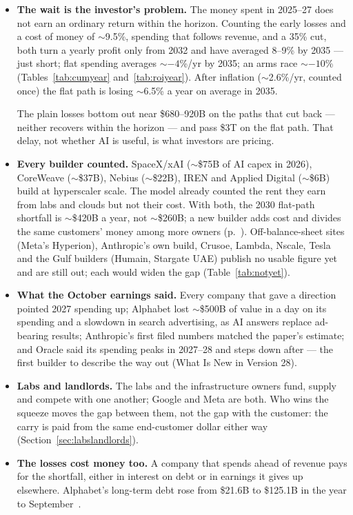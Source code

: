 \documentclass[11pt,letterpaper]{article}
\begin{document}
\begin{itemize}
    \item \textbf{The wait is the investor's problem.} The money spent in 2025--27 does not earn an ordinary return within the horizon. Counting the early losses and a cost of money of $\sim$9.5\%, spending that follows revenue, and a 35\% cut, both turn a yearly profit only from 2032 and have averaged 8--9\% by 2035 --- just short; flat spending averages $\sim-4$\%/yr by 2035; an arms race $\sim-10$\% (Tables~\ref{tab:cumyear} and~\ref{tab:roiyear}). After inflation ($\sim$2.6\%/yr, counted once) the flat path is losing $\sim$6.5\% a year on average in 2035.

    The plain losses bottom out near \$680--920B on the paths that cut back --- neither recovers within the horizon --- and pass \$3T on the flat path. That delay, not whether AI is useful, is what investors are pricing.
    \item \textbf{Every builder counted.} SpaceX/xAI ($\sim$\$75B of AI capex in 2026), CoreWeave ($\sim$\$37B), Nebius ($\sim$\$22B), IREN and Applied Digital ($\sim$\$6B) build at hyperscaler scale. The model already counted the rent they earn from labs and clouds but not their cost. With both, the 2030 flat-path shortfall is $\sim$\$420B a year, not $\sim$\$260B; a new builder adds cost and divides the same customers' money among more owners (p.~\pageref{ag:spacex}). Off-balance-sheet sites (Meta's Hyperion), Anthropic's own build, Crusoe, Lambda, Nscale, Tesla and the Gulf builders (Humain, Stargate UAE) publish no usable figure yet and are still out; each would widen the gap (Table~\ref{tab:notyet}).
    \item \textbf{What the October earnings said.} Every company that gave a direction pointed 2027 spending up; Alphabet lost $\sim$\$500B of value in a day on its spending and a slowdown in search advertising, as AI answers replace ad-bearing results; Anthropic's first filed numbers matched the paper's estimate; and Oracle said its spending peaks in 2027--28 and steps down after --- the first builder to describe the way out (What Is New in Version 28).
    \item \textbf{Labs and landlords.} The labs and the infrastructure owners fund, supply and compete with one another; Google and Meta are both. Who wins the squeeze moves the gap between them, not the gap with the customer: the carry is paid from the same end-customer dollar either way (Section~\ref{sec:labslandlords}).
    \item \textbf{The losses cost money too.} A company that spends ahead of revenue pays for the shortfall, either in interest on debt or in earnings it gives up elsewhere. Alphabet's long-term debt rose from \$21.6B to \$125.1B in the year to September~\cite{ref:yahoo_nasdaq_1029}.


\end{itemize}
\end{document}

